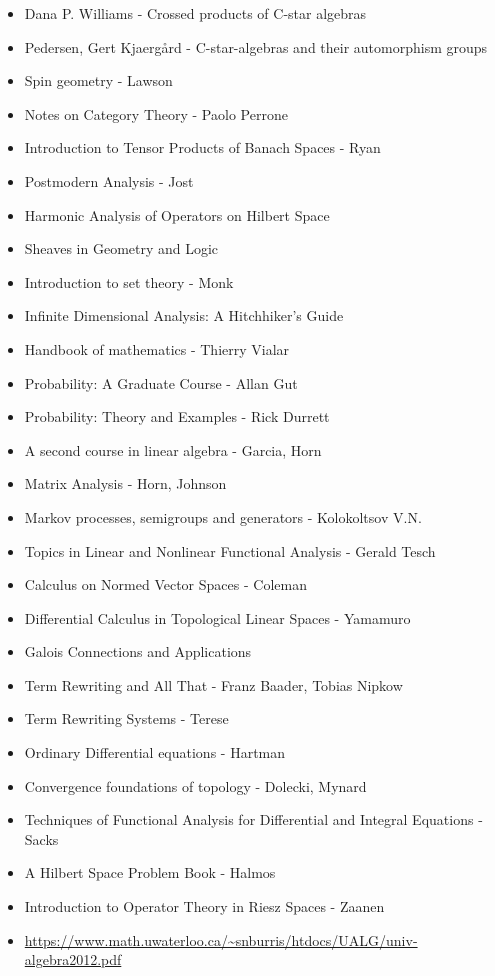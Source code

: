 \documentclass{report}
\begin{document}
\begin{itemize}
\item Dana P. Williams - Crossed products of C-star algebras
\item Pedersen, Gert Kjaergård - C-star-algebras and their automorphism groups
\item Spin geometry - Lawson
\item Notes on Category Theory - Paolo Perrone
\item Introduction to Tensor Products of Banach Spaces - Ryan
\item Postmodern Analysis - Jost
\item Harmonic Analysis of Operators on Hilbert Space
\item Sheaves in Geometry and Logic
\item Introduction to set theory - Monk
\item Infinite Dimensional Analysis: A Hitchhiker’s Guide
\item Handbook of mathematics - Thierry Vialar
\item Probability: A Graduate Course - Allan Gut
\item Probability: Theory and Examples - Rick Durrett
\item A second course in linear algebra - Garcia, Horn
\item Matrix Analysis - Horn, Johnson
\item Markov processes, semigroups and generators - Kolokoltsov V.N.
\item Topics in Linear and Nonlinear Functional Analysis - Gerald Tesch
\item Calculus on Normed Vector Spaces - Coleman
\item Differential Calculus in Topological Linear Spaces - Yamamuro
\item Galois Connections and Applications
\item Term Rewriting and All That - Franz Baader, Tobias Nipkow
\item Term Rewriting Systems - Terese
\item Ordinary Differential equations - Hartman
\item Convergence foundations of topology - Dolecki, Mynard
\item Techniques of Functional Analysis for Differential and Integral Equations - Sacks
\item A Hilbert Space Problem Book - Halmos
\item Introduction to Operator Theory in Riesz Spaces - Zaanen
\item \url{https://www.math.uwaterloo.ca/~snburris/htdocs/UALG/univ-algebra2012.pdf}

\end{itemize}
\end{document}
